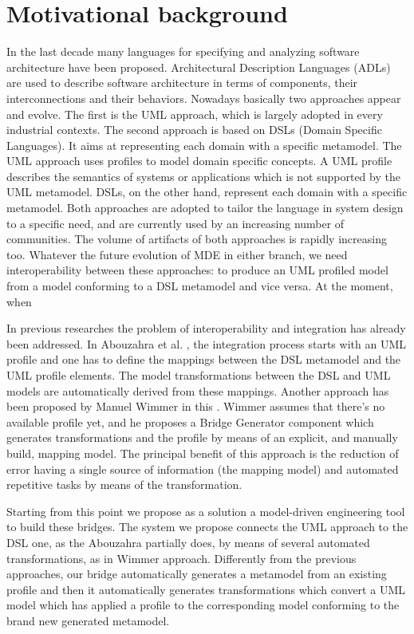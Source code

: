 \section{Motivational background}\label{sec:motivation}




In the last decade many languages for specifying and analyzing software architecture have been proposed. Architectural Description Languages (ADLs) are used to describe software architecture in terms of components, their interconnections and their behaviors. Nowadays basically two approaches appear and evolve. The first is the UML approach, which is largely adopted in every industrial contexts. The second approach is based on DSLs (Domain Specific Languages). It aims at representing each domain with a specific metamodel. The UML approach uses profiles to model domain specific concepts. A UML profile describes the semantics of systems or applications which is not supported by the UML metamodel. DSLs, on the other hand, represent each domain with a specific metamodel. Both approaches are adopted to tailor the language in system design to a specific need, and are currently used by an increasing number of communities. The volume of artifacts of both approaches is rapidly increasing too. Whatever the future evolution of MDE in either branch, we need interoperability between these approaches: to produce an UML profiled model from a model conforming to a DSL metamodel and vice versa. At the moment, when 


In previous researches the problem of interoperability and integration has already been addressed. In Abouzahra et al. \cite{Abouzahra}, the integration process starts with an UML profile and one has to define the mappings between the DSL metamodel and the UML profile elements. The model transformations between the DSL and UML models are automatically derived from these mappings. Another approach has been proposed by Manuel Wimmer in this \cite{Wimmer}. Wimmer assumes that there's no available profile yet, and he proposes a Bridge Generator component which generates transformations and the profile by means of an explicit, and manually build, mapping model. The principal benefit of this approach is the reduction of error having a single source of information (the mapping model) and automated repetitive tasks by means of the transformation.


Starting from this point we propose as a solution a model-driven engineering tool to build these bridges. The system we propose connects the UML approach to the DSL one, as the Abouzahra partially does, by means of several automated transformations, as in Wimmer approach. Differently from the previous approaches, our bridge automatically generates a metamodel from an existing profile and then it automatically generates transformations which convert a UML model which has applied a profile to the corresponding model conforming to the brand new generated metamodel.